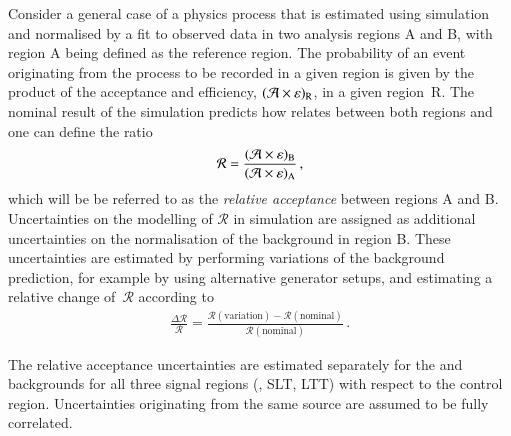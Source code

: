 Consider a general case of a physics process that is estimated using
simulation and normalised by a fit to observed data in two analysis
regions A and B, with region A being defined as the reference
region. The probability of an event originating from the process to be
recorded in a given region is given by the product of the acceptance
and efficiency, $(\mathcal{A} \times \varepsilon)_{\text{R}}$, in a given region~R. The
nominal result of the simulation predicts how \AccTimesEff relates
between both regions and one can define the ratio
\begin{align*}
  \mathcal{R} = \frac{(\mathcal{A} \times \varepsilon)_{\text{B}}}{(\mathcal{A} \times \varepsilon)_{\text{A}}} \,\text{,}
\end{align*}
which will be be referred to as the \emph{relative acceptance} between
regions A and B. Uncertainties on the modelling of $\mathcal{R}$ in
simulation are assigned as additional uncertainties on the
normalisation of the background in region B. These uncertainties are estimated by performing
variations of the background prediction, for example by using
alternative generator setups, and estimating a relative change
of~$\mathcal{R}$ according to
\begin{align}
  \frac{\Delta \mathcal{R}}{\mathcal{R}} = \frac{\mathcal{R}(\text{variation}) - \mathcal{R}(\text{nominal})}{\mathcal{R}(\text{nominal})} \,\text{.}
  \label{eq:relative_acceptance_uncertainty}
\end{align}




The relative acceptance uncertainties are estimated separately for the
\ZHF and \ttbar backgrounds for all three signal regions (\hadhad,
\lephad SLT, \lephad LTT) with respect to the \ZHF control
region. Uncertainties originating from the same source are assumed to
be fully correlated.

